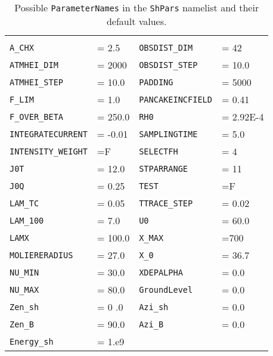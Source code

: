 \begin{table}[!ht]
\caption{Possible {\tt ParameterNames} in the {\tt ShPars} namelist and their default values. }
\begin{tabular}{|l l |l l|}
\hline
\\  \verb<A_CHX< & = 2.5                  &    \verb<OBSDIST_DIM< & =      42
\\  \verb<ATMHEI_DIM< & =       2000      &    \verb<OBSDIST_STEP< & =  10.0
\\  \verb<ATMHEI_STEP< & =  10.0          &    \verb<PADDING< & =       5000
\\  \verb<F_LIM< & =  1.0                 &    \verb<PANCAKEINCFIELD< & = 0.41
\\  \verb<F_OVER_BETA< & =  250.0         &    \verb<RH0< & =  2.92E-4
\\  \verb<INTEGRATECURRENT< & = -0.01     &    \verb<SAMPLINGTIME< & = 5.0
\\  \verb<INTENSITY_WEIGHT< & =F          &    \verb<SELECTFH< & =       4
\\  \verb<J0T< & =  12.0                  &    \verb<STPARRANGE< & =   11
\\  \verb<J0Q< & = 0.25                   &    \verb<TEST< & =F
\\  \verb<LAM_TC< & =  0.05               &    \verb<TTRACE_STEP< & =  0.02
\\  \verb<LAM_100< & =  7.0               &    \verb<U0< & =  60.0
\\  \verb<LAMX< & =  100.0                &    \verb<X_MAX< & =700
\\  \verb<MOLIERERADIUS< & =  27.0        &    \verb<X_0< & =  36.7
\\  \verb<NU_MIN< & =  30.0               &    \verb<XDEPALPHA< & =  0.0
\\  \verb<NU_MAX< & =  80.0               &    \verb<GroundLevel< & =  0.0
\\  \verb<Zen_sh< & =  0 .0               &    \verb<Azi_sh< & =  0.0
\\  \verb<Zen_B< & =   90.0               &    \verb<Azi_B< & =  0.0
\\  \verb<Energy_sh< & =  1.e9            &    & \\
\hline
\end{tabular}
\end{table}



